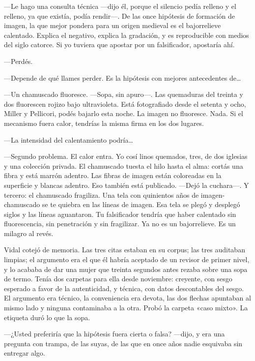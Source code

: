 ---Le hago una consulta técnica ---dijo él, porque el silencio pedía relleno y el relleno, ya que existía, podía rendir---. De las once hipótesis de formación de imagen, la que mejor pondera para un origen medieval es el bajorrelieve calentado. Explica el negativo, explica la gradación, y es reproducible con medios del siglo catorce. Si yo tuviera que apostar por un falsificador, apostaría ahí.

---Perdés.

---Depende de qué llames perder. Es la hipótesis con mejores antecedentes de\ldots{}

---Un chamuscado fluoresce. ---Sopa, sin apuro---. Las quemaduras del treinta y dos fluorescen rojizo bajo ultravioleta. Está fotografiado desde el setenta y ocho, Miller y Pellicori, podés bajarlo esta noche. La imagen no fluoresce. Nada. Si el mecanismo fuera calor, tendrías la misma firma en los dos lugares.

---La intensidad del calentamiento podría\ldots{}

---Segundo problema. El calor entra. Yo cosí linos quemados, tres, de dos iglesias y una colección privada. El chamuscado tuesta el hilo hasta el alma: cortás una fibra y está marrón adentro. Las fibras de imagen están coloreadas en la superficie y blancas adentro. Eso también está publicado. ---Dejó la cuchara---. Y tercero: el chamuscado fragiliza. Una tela con quinientos años de imagen-chamuscado se te quiebra en las líneas de imagen. Esa tela se plegó y desplegó siglos y las líneas aguantaron. Tu falsificador tendría que haber calentado sin fluorescencia, sin penetración y sin fragilizar. Ya no es un bajorrelieve. Es un milagro al revés.

Vidal cotejó de memoria. Las tres citas estaban en su corpus; las tres auditaban limpias; el argumento era el que él habría aceptado de un revisor de primer nivel, y lo acababa de dar una mujer que treinta segundos antes rezaba sobre una sopa de termo. Tenía dos carpetas para ella desde noviembre: creyente, con sesgo esperado a favor de la autenticidad, y técnica, con datos descontables del sesgo. El argumento era técnico, la conveniencia era devota, las dos flechas apuntaban al mismo lado y ninguna contaminaba a la otra. Probó la carpeta «caso mixto». La etiqueta duró lo que la sopa.

---¿Usted preferiría que la hipótesis fuera cierta o falsa? ---dijo, y era una pregunta con trampa, de las suyas, de las que en once años nadie esquivaba sin entregar algo.

